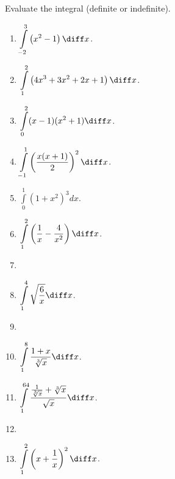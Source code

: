 Evaluate the integral (definite or indefinite).
\begin{multicols}{3}
\begin{enumerate}[ref={\fcProblemRef}]
\item $\displaystyle \int\limits_{-2}^{3} \left(x^2-1 \right)  \diff x$.


\item $\displaystyle \int\limits_{1}^{2} \left(4x^3+3x^2+2x+1\right)  \diff x$.

\item $\displaystyle \int\limits_{0}^{2}(x-1)(x^2+1)  \diff x$.

\item $\displaystyle \int\limits_{-1}^{1} \left( \frac{x(x+1) }{ 2} \right)^2  \diff x$.

\item $\displaystyle \int\limits_{0}^{1}(1+x^2)^3 dx$.

\item $\displaystyle \int \limits_{1}^{2} \left(\frac{1}{x} - \frac{4}{x^2} \right)  \diff x$.

\item 
\item $\displaystyle \int\limits_{1}^{4} \sqrt{ \frac{6 }{x }} \diff x$.

\item 
\item $\displaystyle \int \limits_{1}^{8} \frac{1+x}{ \sqrt[3]{x}} \diff x$.

\item $\displaystyle \int\limits_{1}^{64} \frac{\frac{1}{ \sqrt[3]{x}} +\sqrt[3]{x}}{ \sqrt{x}}\diff x$.

\item 
\item $\displaystyle \int\limits_{1}^{2} \left(x + \frac{1}{x} \right)^2 \diff x$.


\end{enumerate}
\end{multicols}

